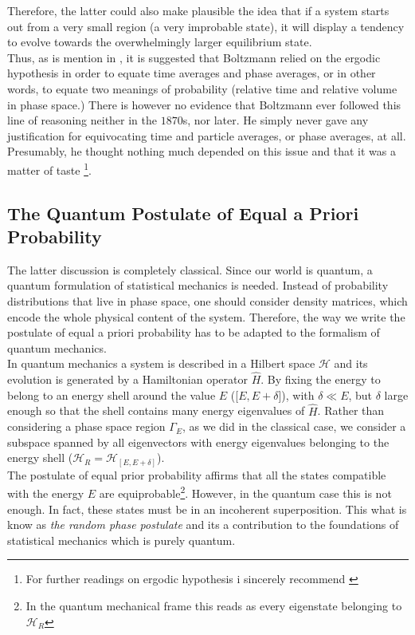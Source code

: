 \indent Therefore, the latter could also make plausible  the idea that if a system starts out from a very small region (a very improbable state), it will display a tendency to evolve towards the overwhelmingly larger equilibrium state.\\

\indent Thus, as is mention in \cite{ehrenfest_conceptual_1959}, it is  suggested that Boltzmann relied on the ergodic hypothesis in order to equate time averages and phase averages, or in other words, to equate two meanings of probability (relative time and relative volume in phase space.) There is however no evidence that Boltzmann ever followed this line of reasoning neither in the $1870$s, nor later. He simply never gave any justification for equivocating time and particle averages, or phase averages, at all. Presumably, he thought nothing much depended on this issue and that it was a matter of taste \footnote{For further readings on ergodic hypothesis i sincerely recommend \cite{oliveira_ergodic_2007, engelhardt_simple_2015, gallavotti_statistical_1999,goldstein_boltzmanns_2001,uffink_handbook_2007}}.


\subsection{The Quantum Postulate of Equal a Priori Probability}
The latter discussion is completely classical. Since our world is quantum, a quantum formulation of statistical mechanics is needed. Instead of probability distributions that live in phase space, one should consider density matrices, which encode the whole physical content of the system. Therefore, the way we write the postulate of equal a priori probability has to be adapted to the formalism of quantum mechanics.\\

\indent In quantum mechanics a system is described in a Hilbert space $\mathcal{H}$ and its evolution is generated by a Hamiltonian operator $\hat{H}$. By fixing the energy to belong to an energy shell around the value $E$ ([$E,E+\delta$]), with $\delta\ll E$, but $\delta$ large enough so that the shell contains many energy eigenvalues of $\hat{H}$. Rather than considering a phase space region $\Gamma_{E}$, as we did in the classical case, we consider a subspace spanned by all eigenvectors with energy eigenvalues belonging to the energy shell ($\mathcal{H}_{R}=\mathcal{H}_{[E,E+\delta]}$).\\

\indent The postulate of equal prior probability affirms that all the states compatible with the energy $E$ are equiprobable\footnote{In the quantum mechanical frame this reads as every eigenstate belonging to $\mathcal{H}_R$}. However, in the quantum case this is not enough. In fact, these states must be in an incoherent superposition. This what is know as  \textit{the random phase postulate} and its a contribution to the foundations of statistical mechanics which is purely quantum.\\

